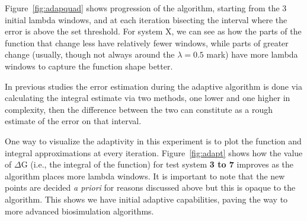 Figure~\ref{fig:adapquad} shows progression of the algorithm, starting from the 
3 initial lambda windows, and at each iteration bisecting the interval where 
the error is above the set threshold. For system X, we can see as how the parts 
of the function that change less have relatively fewer windows, while parts of 
greater change (usually, though not always around the $\lambda=0.5$ mark) have 
more lambda windows to capture the function shape better. 

 In previous studies \cite{} the 
error estimation during the adaptive algorithm is done via calculating the 
integral estimate via two methods, one lower and one higher in complexity, then 
the difference between the two can constitute as a rough estimate of the error 
on that interval.


One way to visualize the adaptivity in this experiment is to plot the
function and integral approximations at every iteration.
Figure~\ref{fig:adapt} shows how the value of $\Delta$G (i.e., the integral
of the function) for test system \textbf{3 to 7}  improves as the
algorithm places more lambda windows. It is important to note that the new
points are decided {\it a priori} for reasons discussed above but this is
opaque to the algorithm. This shows we have initial adaptive capabilities,
paving the way to more advanced biosimulation algorithms.

